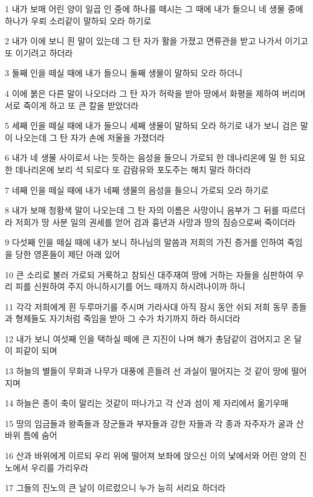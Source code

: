 \par 1 내가 보매 어린 양이 일곱 인 중에 하나를 떼시는 그 때에 내가 들으니 네 생물 중에 하나가 우뢰 소리같이 말하되 오라 하기로
\par 2 내가 이에 보니 흰 말이 있는데 그 탄 자가 활을 가졌고 면류관을 받고 나가서 이기고 또 이기려고 하더라
\par 3 둘째 인을 떼실 때에 내가 들으니 둘째 생물이 말하되 오라 하더니
\par 4 이에 붉은 다른 말이 나오더라 그 탄 자가 허락을 받아 땅에서 화평을 제하여 버리며 서로 죽이게 하고 또 큰 칼을 받았더라
\par 5 세째 인을 떼실 때에 내가 들으니 세째 생물이 말하되 오라 하기로 내가 보니 검은 말이 나오는데 그 탄 자가 손에 저울을 가졌더라
\par 6 내가 네 생물 사이로서 나는 듯하는 음성을 들으니 가로되 한 데나리온에 밀 한 되요 한 데나리온에 보리 석 되로다 또 감람유와 포도주는 해치 말라 하더라
\par 7 네째 인을 떼실 때에 내가 네째 생물의 음성을 들으니 가로되 오라 하기로
\par 8 내가 보매 청황색 말이 나오는데 그 탄 자의 이름은 사망이니 음부가 그 뒤를 따르더라 저희가 땅 사분 일의 권세를 얻어 검과 흉년과 사망과 땅의 짐승으로써 죽이더라
\par 9 다섯째 인을 떼실 때에 내가 보니 하나님의 말씀과 저희의 가진 증거를 인하여 죽임을 당한 영혼들이 제단 아래 있어
\par 10 큰 소리로 불러 가로되 거룩하고 참되신 대주재여 땅에 거하는 자들을 심판하여 우리 피를 신원하여 주지 아니하시기를 어느 때까지 하시려나이까 하니
\par 11 각각 저희에게 흰 두루마기를 주시며 가라사대 아직 잠시 동안 쉬되 저희 동무 종들과 형제들도 자기처럼 죽임을 받아 그 수가 차기까지 하라 하시더라
\par 12 내가 보니 여섯째 인을 택하실 떼에 큰 지진이 나며 해가 총담같이 검어지고 온 달이 피같이 되며
\par 13 하늘의 별들이 무화과 나무가 대풍에 흔들려 선 과실이 떨어지는 것 같이 땅에 떨어지며
\par 14 하늘은 종이 축이 말리는 것같이 떠나가고 각 산과 섬이 제 자리에서 옮기우매
\par 15 땅의 임금들과 왕족들과 장군들과 부자들과 강한 자들과 각 종과 자주자가 굴과 산 바위 틈에 숨어
\par 16 산과 바위에게 이르되 우리 위에 떨어져 보좌에 앉으신 이의 낯에서와 어린 양의 진노에서 우리를 가리우라
\par 17 그들의 진노의 큰 날이 이르렀으니 누가 능히 서리요 하더라

